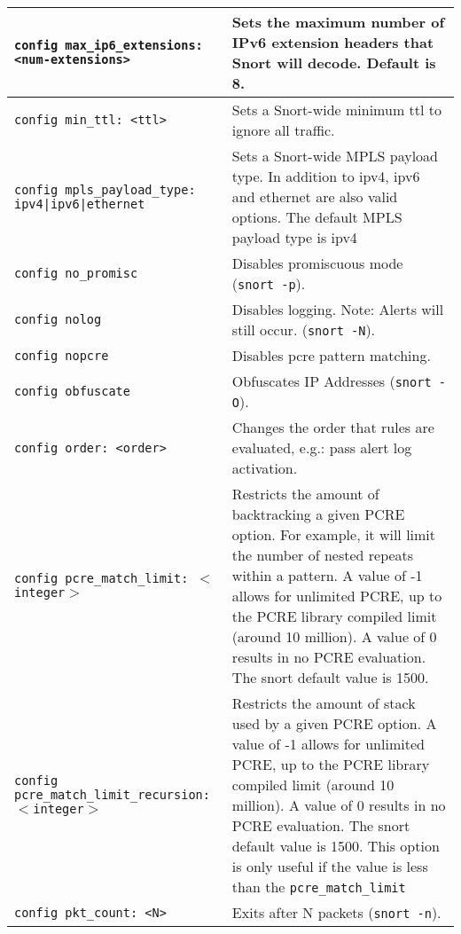 \documentclass[english]{report}
\begin{document}
\begin{center}
\begin{longtable}[t]{| p{2.5in} | p{3.5in} |}
\hline
\texttt{config max\_ip6\_extensions: <num-extensions>} & Sets the maximum number
of IPv6 extension headers that Snort will decode. Default is 8. \\

\hline
\texttt{config min\_ttl: <ttl>} & Sets a Snort-wide minimum ttl to ignore all
traffic. \\

\hline
\texttt{config mpls\_payload\_type: ipv4|ipv6|ethernet} & Sets a Snort-wide
MPLS payload type. In addition to ipv4, ipv6 and ethernet are also valid
options. The default MPLS payload type is ipv4\\

\hline
\texttt{config no\_promisc} & Disables promiscuous mode (\texttt{snort -p}). \\

\hline
\texttt{config nolog} & Disables logging. Note: Alerts will still occur.
(\texttt{snort -N}). \\

\hline
\texttt{config nopcre} & Disables pcre pattern matching. \\

\hline
\texttt{config obfuscate} & Obfuscates IP Addresses (\texttt{snort -O}). \\

\hline
\texttt{config order: <order>} & Changes the order that rules
are evaluated, e.g.: pass alert log activation. \\

\hline
\texttt{config pcre\_match\_limit: $<$integer$>$} & Restricts the amount of
backtracking a given PCRE option.  For example, it will limit the number of
nested repeats within a pattern.  A value of -1 allows for unlimited PCRE, up
to the PCRE library compiled limit (around 10 million).  A value of 0 results
in no PCRE evaluation.  The snort default value is 1500.  \\

\hline
\texttt{config pcre\_match\_limit\_recursion: $<$integer$>$} & Restricts the
amount of stack used by a given PCRE option.  A value of -1 allows for
unlimited PCRE, up to the PCRE library compiled limit (around 10 million).  A
value of 0 results in no PCRE evaluation.  The snort default value is 1500.
This option is only useful if the value is less than the
\texttt{pcre\_match\_limit} \\

\hline
\texttt{config pkt\_count: <N>} & Exits after N packets (\texttt{snort -n}). \\


\end{longtable}
\end{center}
\end{document}
